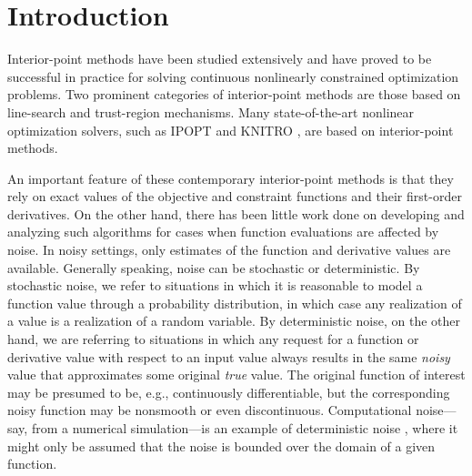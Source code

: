\section{Introduction}

Interior-point methods have been studied extensively and have proved to be successful in practice for solving continuous nonlinearly constrained optimization problems. Two prominent categories of interior-point methods are those based on line-search 
\cite{CurtScheWaec10,wachter2005line,wachter2006implementation,yamashita1998globally} 
and trust-region 
\cite{byrd2000trust,byrd1999interior,yamashita2005globally} 
mechanisms.  Many state-of-the-art nonlinear optimization solvers, such as IPOPT \cite{wachter2006implementation} and KNITRO \cite{byrd2006k}, are based on interior-point methods.

An important feature of these contemporary interior-point methods is that they rely on exact values of the objective and constraint functions and their first-order derivatives.  On the other hand, there has been little work done on developing and analyzing such algorithms for cases when function evaluations are affected by noise.  In noisy settings, only estimates of the function and derivative values are available.  Generally speaking, noise can be stochastic or deterministic.  By stochastic noise, we refer to situations in which it is reasonable to model a function value through a probability distribution, in which case any realization of a value is a realization of a random variable.  By deterministic noise, on the other hand, we are referring to situations in which any request for a function or derivative value with respect to an input value always results in the same \emph{noisy} value that approximates some original \emph{true} value.  The original function of interest may be presumed to be, e.g., continuously differentiable, but the corresponding noisy function may be nonsmooth or even discontinuous. Computational noise---say, from a numerical simulation---is an example of deterministic noise \cite{shi2021methods}, where it might only be assumed that the noise is bounded over the domain of a given function.

